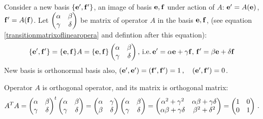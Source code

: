\documentclass[12pt]{article}
\numberwithin{equation}{section}
\begin{document}
Consider a new basis $\{{\bf e}',{\bf f}'\}$, an image of basis ${{\bf e},{\bf f}}$
under action of $A$: ${\bf e}'=A({\bf e})$, ${\bf f}'=A({\bf f})$. Let $ \begin{pmatrix}
      \alpha & \beta \\
      \gamma & \delta\\
       \end{pmatrix}$  be matrix of operator $A$ in the basis ${{\bf e},{\bf f}}$,
(see
 equation \eqref{transitionmatrixoflinearopera} and defintion 
after this equation):
             $$
    \{{\bf e}',{\bf f}'\}=\{{\bf e},{\bf f}\}A=  \{{\bf e},{\bf f}\}
   \begin{pmatrix}
      \alpha & \beta \\
      \gamma & \delta\\
       \end{pmatrix},
\, {\rm i.e.}\,{\bf e}'=\alpha {\bf e}+\gamma {\bf f},\, {\bf f}'=\beta {\bf e}+\delta {\bf f}
                $$
New basis is orthonormal basis also,
 $({\bf e}',{\bf e}')=({\bf f}',{\bf f}')=1\,,\quad ({\bf e}',{\bf f}')=0$.

Operator $A$ is orthogonal operator, and its matrix is orthogonal matrix:
      \begin{equation*}    
A^TA=\begin{pmatrix}
      \alpha & \beta \\
      \gamma & \delta\\
       \end{pmatrix}^t
       \begin{pmatrix}
      \alpha & \beta \\
      \gamma & \delta\\
       \end{pmatrix}=
       \begin{pmatrix}
      \alpha & \gamma \\
      \beta & \delta\\
       \end{pmatrix}
       \begin{pmatrix}
      \alpha & \beta \\
      \gamma & \delta\\
       \end{pmatrix}=
       \begin{pmatrix}
      \alpha^2+\gamma^2 & \alpha\beta+\gamma\delta \\
      \alpha\beta+\gamma\delta & \beta^2+\delta^2\\
       \end{pmatrix}=
       \begin{pmatrix}
      1 & 0 \\
      0& 1\\
       \end{pmatrix}\,.
\end{equation*}
\end{document}

